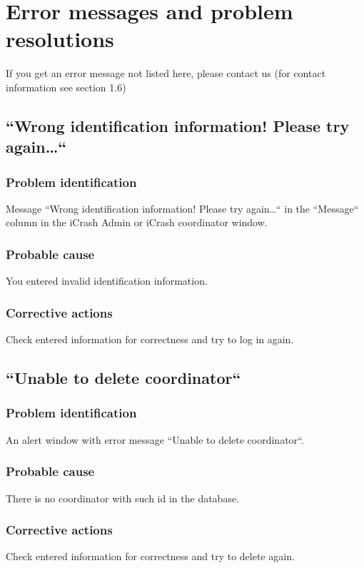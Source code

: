 
\chapter{Error messages and problem resolutions}
\label{chap:error_messages}

If you get an error message not listed here, please contact us (for contact
information see section 1.6)

\section{``Wrong identification information! Please try again\ldots``}

\subsection{Problem identification}
Message ``Wrong identification information! Please try again\ldots`` in the
``Message`` column in the iCrash Admin or iCrash coordinator window.

\subsection{Probable cause}
You entered invalid identification information. 

\subsection{Corrective actions}
Check entered information for correctness  and try to log in again.

\section{``Unable to delete coordinator``}

\subsection{Problem identification}
An alert window with error message ``Unable to delete coordinator``.

\subsection{Probable cause}
There is no coordinator with such id in the database. 

\subsection{Corrective actions}
Check entered information for correctness and try to delete again.

